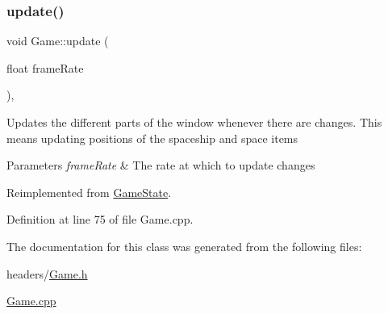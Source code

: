 \subsubsection{\texorpdfstring{update()}{update()}}
{\footnotesize\ttfamily void Game\+::update (\begin{DoxyParamCaption}\item[{float}]{frame\+Rate }\end{DoxyParamCaption})\hspace{0.3cm}{\ttfamily [override]}, {\ttfamily [virtual]}}

Updates the different parts of the window whenever there are changes. This means updating positions of the spaceship and space items 
\begin{DoxyParams}{Parameters}
{\em frame\+Rate} & The rate at which to update changes \\
\hline
\end{DoxyParams}


Reimplemented from \mbox{\hyperlink{class_game_state_a52648f2b2e90f0e1e41a1763ebb061ba}{Game\+State}}.



Definition at line 75 of file Game.\+cpp.



The documentation for this class was generated from the following files\+:\begin{DoxyCompactItemize}
\item 
headers/\mbox{\hyperlink{_game_8h}{Game.\+h}}\item 
\mbox{\hyperlink{_game_8cpp}{Game.\+cpp}}\end{DoxyCompactItemize}
